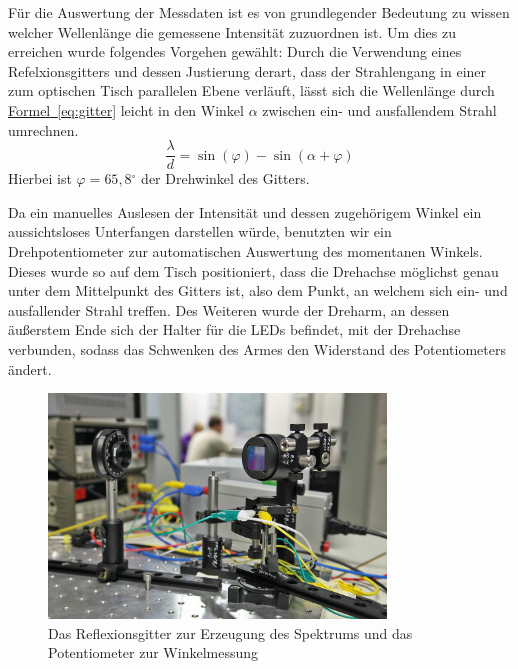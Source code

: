\documentclass[11pt]{scrartcl}
\newcommand{\degr}{\ensuremath{^\circ}}
\newcommand{\hypref}[2]{\hyperref[#2]{{#1}~\ref{#2}}}
\begin{document}
F\"ur die Auswertung der Messdaten ist es von grundlegender Bedeutung zu wissen welcher Wellenl\"ange die gemessene Intensit\"at zuzuordnen ist. Um dies zu erreichen wurde folgendes Vorgehen gew\"ahlt: Durch die Verwendung eines Refelxionsgitters und dessen Justierung derart, dass der Strahlengang in einer zum optischen Tisch parallelen Ebene verl\"auft, l\"asst sich die Wellenl\"ange durch \hypref{Formel}{eq:gitter} leicht in den Winkel $\alpha$ zwischen ein- und ausfallendem Strahl umrechnen.
\begin{equation}
\frac{\lambda}{d} = \sin(\varphi) - \sin(\alpha + \varphi)
\label{eq:gitter}
\end{equation}
Hierbei ist $\varphi = 65,8\degr$ der Drehwinkel des Gitters.

Da ein manuelles Auslesen der Intensit\"at und dessen zugeh\"origem Winkel ein aussichtsloses Unterfangen darstellen w\"urde, benutzten wir ein Drehpotentiometer zur automatischen Auswertung des momentanen Winkels. Dieses wurde so auf dem Tisch positioniert, dass die Drehachse m\"oglichst genau unter dem Mittelpunkt des Gitters ist, also dem Punkt, an welchem sich ein- und ausfallender Strahl treffen. Des Weiteren wurde der Dreharm, an dessen äu\ss{}erstem Ende sich der Halter f\"ur die LEDs befindet, mit der Drehachse verbunden, sodass das Schwenken des Armes den Widerstand des Potentiometers \"andert.

\begin{figure}[ht]
\begin{center}
\includegraphics[width=0.8\textwidth]{poti-reflexgitter.jpg}
\end{center}
\vspace{-1.5\baselineskip}
\caption{Das Reflexionsgitter zur Erzeugung des Spektrums und das Potentiometer zur Winkelmessung}
\label{fig:poti-reflexgitter}
\end{figure}
\end{document}
